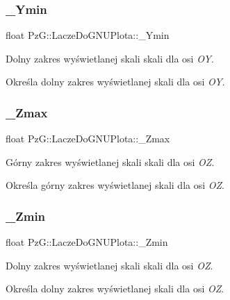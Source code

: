 \subsubsection{\texorpdfstring{\_Ymin}{\_Ymin}}
{\footnotesize\ttfamily float Pz\+G\+::\+Lacze\+Do\+G\+N\+U\+Plota\+::\+\_\+\+Ymin\hspace{0.3cm}{\ttfamily [protected]}}



Dolny zakres wyświetlanej skali skali dla osi {\itshape OY}. 

Określa dolny zakres wyświetlanej skali dla osi {\itshape OY}. \mbox{\label{class_pz_g_1_1_lacze_do_g_n_u_plota_a26949eedd421832f0f206ce3c8f90694}} 
\subsubsection{\texorpdfstring{\_Zmax}{\_Zmax}}
{\footnotesize\ttfamily float Pz\+G\+::\+Lacze\+Do\+G\+N\+U\+Plota\+::\+\_\+\+Zmax\hspace{0.3cm}{\ttfamily [protected]}}



Górny zakres wyświetlanej skali skali dla osi {\itshape OZ}. 

Określa górny zakres wyświetlanej skali dla osi {\itshape OZ}. \mbox{\label{class_pz_g_1_1_lacze_do_g_n_u_plota_a8f9797e881df35f4206cb7d8030e5edc}} 
\subsubsection{\texorpdfstring{\_Zmin}{\_Zmin}}
{\footnotesize\ttfamily float Pz\+G\+::\+Lacze\+Do\+G\+N\+U\+Plota\+::\+\_\+\+Zmin\hspace{0.3cm}{\ttfamily [protected]}}



Dolny zakres wyświetlanej skali skali dla osi {\itshape OZ}. 

Określa dolny zakres wyświetlanej skali dla osi {\itshape OZ}. \mbox{\label{class_pz_g_1_1_lacze_do_g_n_u_plota_aa65781b1ff96dfb31a780e98ee28d6ed}} 
